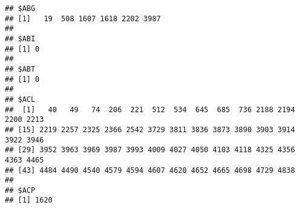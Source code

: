 \documentclass[]{article}
\begin{document}
\begin{verbatim}
## $ABG
## [1]   19  508 1607 1618 2202 3987
## 
## $ABI
## [1] 0
## 
## $ABT
## [1] 0
## 
## $ACL
##  [1]   40   49   74  206  221  512  534  645  685  736 2188 2194 2200 2213
## [15] 2219 2257 2325 2366 2542 3729 3811 3836 3873 3890 3903 3914 3922 3946
## [29] 3952 3963 3969 3987 3993 4009 4027 4050 4103 4118 4325 4356 4363 4465
## [43] 4484 4490 4540 4579 4594 4607 4620 4652 4665 4698 4729 4838
## 
## $ACP
## [1] 1620
\end{verbatim}
\end{document}
